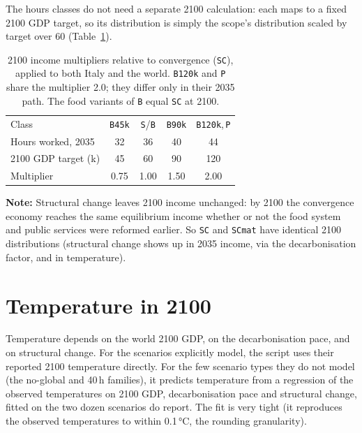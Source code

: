 \documentclass[12pt,a4paper]{article}
\newcommand{\note}[1]{%
  \begin{center}
    \colorbox{yellow!30}{\parbox{0.9\linewidth}{\textbf{Note:} #1}}
  \end{center}}
\newcommand{\scenario}[1]{\texttt{#1}}
\newcommand{\EUR}{\texteuro}
\begin{document}
The hours classes do not need a separate 2100 calculation: each maps to a fixed 2100 GDP target, so its distribution is simply the scope's distribution scaled by target over 60 (Table~\ref{tab:coefs2100}). %

\begin{table}[ht]
\centering
\caption{2100 income multipliers relative to convergence (\scenario{SC}), applied to both Italy and
  the world. \scenario{B120k} and \scenario{P} share the multiplier 2.0; they differ only in their
  2035 path. The food variants of \scenario{B} equal \scenario{SC} at 2100.}
\label{tab:coefs2100}
\begin{tabular}{lcccc}
\toprule
Class & \scenario{B45k} & \scenario{S}/\scenario{B} & \scenario{B90k} & \scenario{B120k},\,\scenario{P} \\
Hours worked, 2035 & 32 & 36 & 40 & 44 \\
2100 GDP target (k\EUR) & 45 & 60 & 90 & 120 \\
\midrule
Multiplier & 0.75 & 1.00 & 1.50 & 2.00 \\
\bottomrule
\end{tabular}
\end{table}


\note{%
  Structural change leaves 2100 income unchanged: by 2100 the convergence economy reaches the same equilibrium income whether or not the food system and public services were reformed earlier. So \scenario{SC} and \scenario{SCmat} have identical 2100 distributions (structural change shows up in 2035 income, via the decarbonisation factor, and in temperature).
}

\section{Temperature in 2100}
\label{sec:temperature}

Temperature depends on the world 2100 GDP, on the decarbonisation pace, and on structural change. For the scenarios \citet{Chancel2026} explicitly model, the script uses their reported 2100 temperature directly. For the few scenario types they do not model (the no-global and 40\,h families), it predicts temperature from a regression of the observed temperatures on 2100 GDP, decarbonisation pace and structural change, fitted on the two dozen scenarios \citet{Chancel2026} do
report. The fit is very tight (it reproduces the observed temperatures to within 0.1\,°C, the rounding granularity). %
\end{document}
